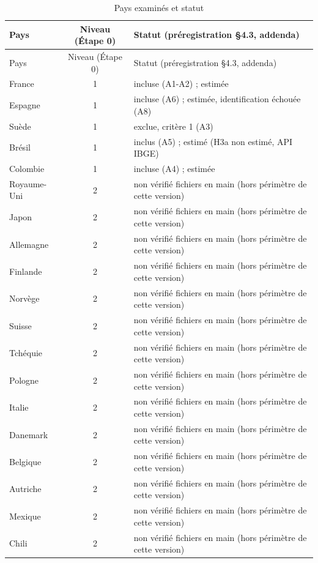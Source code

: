 \begin{longtable}{lcp{7.5cm}}
\caption{Pays examinés et statut}\label{tab:countries}\\
\toprule
Pays & Niveau (Étape 0) & Statut (préregistration §4.3, addenda) \\
\midrule
\endfirsthead
\toprule
Pays & Niveau (Étape 0) & Statut (préregistration §4.3, addenda) \\
\midrule
\endhead
\bottomrule
\endfoot
France & 1 & incluse (A1-A2) ; estimée \\
Espagne & 1 & incluse (A6) ; estimée, identification échouée (A8) \\
Suède & 1 & exclue, critère 1 (A3) \\
Brésil & 1 & inclus (A5) ; estimé (H3a non estimé, API IBGE) \\
Colombie & 1 & incluse (A4) ; estimée \\
Royaume-Uni & 2 & non vérifié fichiers en main (hors périmètre de cette version) \\
Japon & 2 & non vérifié fichiers en main (hors périmètre de cette version) \\
Allemagne & 2 & non vérifié fichiers en main (hors périmètre de cette version) \\
Finlande & 2 & non vérifié fichiers en main (hors périmètre de cette version) \\
Norvège & 2 & non vérifié fichiers en main (hors périmètre de cette version) \\
Suisse & 2 & non vérifié fichiers en main (hors périmètre de cette version) \\
Tchéquie & 2 & non vérifié fichiers en main (hors périmètre de cette version) \\
Pologne & 2 & non vérifié fichiers en main (hors périmètre de cette version) \\
Italie & 2 & non vérifié fichiers en main (hors périmètre de cette version) \\
Danemark & 2 & non vérifié fichiers en main (hors périmètre de cette version) \\
Belgique & 2 & non vérifié fichiers en main (hors périmètre de cette version) \\
Autriche & 2 & non vérifié fichiers en main (hors périmètre de cette version) \\
Mexique & 2 & non vérifié fichiers en main (hors périmètre de cette version) \\
Chili & 2 & non vérifié fichiers en main (hors périmètre de cette version) \\

\end{longtable}
